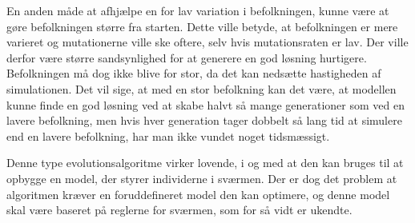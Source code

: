 En anden måde at afhjælpe en for lav variation i befolkningen, kunne være at gøre befolkningen større fra starten. Dette ville betyde, at befolkningen er mere varieret og mutationerne ville ske oftere, selv hvis mutationsraten er lav. Der ville derfor være større sandsynlighed for at generere en god løsning hurtigere. Befolkningen må dog ikke blive for stor, da det kan nedsætte hastigheden af simulationen. Det vil sige, at med en stor befolkning kan det være, at modellen kunne finde en god løsning ved at skabe halvt så mange generationer som ved en lavere befolkning, men hvis hver generation tager dobbelt så lang tid at simulere end en lavere befolkning, har man ikke vundet noget tidsmæssigt.
\par
Denne type evolutionsalgoritme virker lovende, i og med at den kan bruges til at opbygge en model, der styrer individerne i sværmen. Der er dog det problem at algoritmen kræver en foruddefineret model den kan optimere, og denne model skal være baseret på reglerne for sværmen, som for så vidt er ukendte.


